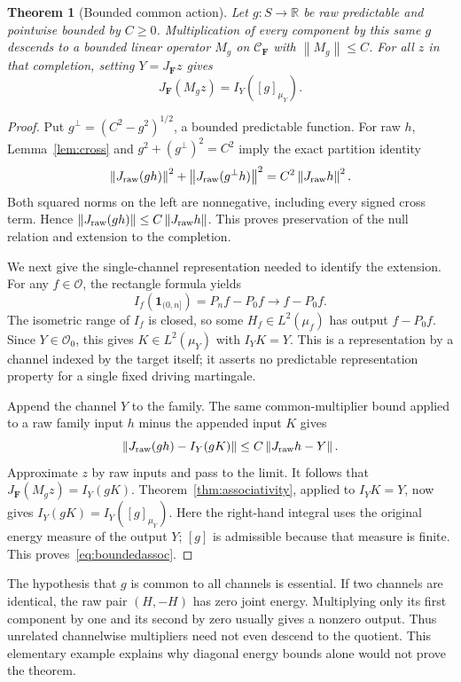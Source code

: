 \documentclass[11pt]{article}
\newtheorem{theorem}{Theorem}[section]
\theoremstyle{remark}\newtheorem{remark}[theorem]{Remark}
\newcommand{\R}{\mathbb R}
\newcommand{\one}{\mathbf1}
\newcommand{\norm}[1]{\left\lVert#1\right\rVert}
\newcommand{\OO}{\mathcal O}
\begin{document}
\begin{theorem}[Bounded common action]\label{thm:multiplier}
Let $g:S\to\R$ be raw predictable and pointwise bounded by $C\geq0$.
Multiplication of every component by this same $g$ descends to a
bounded linear operator $M_g$ on $\mathcal C_{\mathbf F}$ with
$\norm{M_g}\leq C$. For all $z$ in that completion, setting
$Y=J_{\mathbf F}z$ gives
\begin{equation}\label{eq:boundedassoc}
 J_{\mathbf F}(M_gz)=I_Y([g]_{\mu_Y}).
\end{equation}
\end{theorem}
\begin{proof}
Put $g^\perp=(C^2-g^2)^{1/2}$, a bounded predictable function.
For raw $h$, Lemma~\ref{lem:cross} and
$g^2+(g^\perp)^2=C^2$ imply the exact partition identity
\[
 \norm{J_{\rm raw}(gh)}^2+
 \norm{J_{\rm raw}(g^\perp h)}^2
 =C^2\norm{J_{\rm raw}h}^2.
\]
Both squared norms on the left are nonnegative, including every signed
cross term. Hence $\norm{J_{\rm raw}(gh)}\leq
C\norm{J_{\rm raw}h}$. This proves preservation of the null relation
and extension to the completion.

We next give the single-channel representation needed to identify the
extension. For any $f\in\OO$, the rectangle formula yields
\[
 I_f(\one_{(0,n]})=P_nf-P_0f\longrightarrow f-P_0f.
\]
The isometric range of $I_f$ is closed, so some $H_f\in L^2(\mu_f)$
has output $f-P_0f$. Since $Y\in\OO_0$, this gives
$K\in L^2(\mu_Y)$ with $I_YK=Y$. This is a representation by a
channel indexed by the target itself; it asserts no predictable
representation property for a single fixed driving martingale.

Append the channel $Y$ to the family. The same common-multiplier bound
applied to a raw family input $h$ minus the appended input $K$ gives
\[
 \norm{J_{\rm raw}(gh)-I_Y(gK)}
 \leq C\norm{J_{\rm raw}h-Y}.
\]
Approximate $z$ by raw inputs and pass to the limit. It follows that
$J_{\mathbf F}(M_gz)=I_Y(gK)$.
Theorem~\ref{thm:associativity}, applied to $I_YK=Y$, now gives
$I_Y(gK)=I_Y([g]_{\mu_Y})$. Here the right-hand integral uses the
original energy measure of the output $Y$; $[g]$ is admissible because
that measure is finite. This proves~\eqref{eq:boundedassoc}.
\end{proof}

The hypothesis that $g$ is common to all channels is essential. If two
channels are identical, the raw pair $(H,-H)$ has zero joint energy.
Multiplying only its first component by one and its second by zero
usually gives a nonzero output. Thus unrelated channelwise multipliers
need not even descend to the quotient. This elementary example explains
why diagonal energy bounds alone would not prove the theorem.
\end{document}
